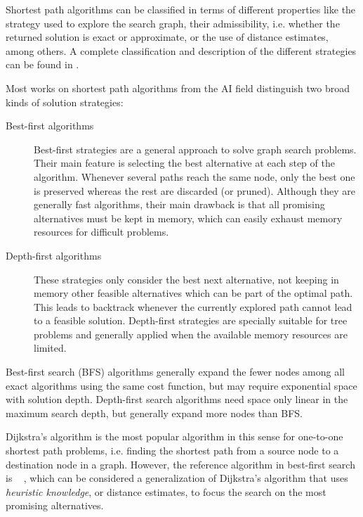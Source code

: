 Shortest path algorithms can be classified in terms of different properties like the strategy used to explore the search graph, their admissibility, i.e. whether the returned solution is exact or approximate, or the use of distance estimates, among others. A complete classification and description of the different strategies can be found in \citet{korf2010}.

Most works on shortest path algorithms from the AI field distinguish two broad kinds of solution strategies:

\begin{description}
    \item[Best-first algorithms] 
Best-first strategies are a general approach to solve graph search problems. Their main feature is selecting the best alternative at each step of the algorithm. Whenever several paths reach the same node, only the best one is preserved whereas the rest are discarded (or pruned). Although they are generally fast algorithms, their main drawback is that all promising alternatives must be kept in memory, which can easily exhaust memory resources for difficult problems.
	 \item[Depth-first algorithms] \citep{Korf1985} These strategies only consider the best next alternative, not keeping in memory other feasible alternatives which can be part of the optimal path. This leads to backtrack whenever the currently explored path cannot lead to a feasible solution. Depth-first strategies are specially suitable for tree problems and generally applied when the available memory resources are limited. 
\end{description}

Best-first search (BFS) algorithms generally expand the fewer nodes among all exact algorithms using the same cost function, but may require exponential space with solution depth. Depth-first search algorithms need space only linear in the maximum search depth, but generally expand more nodes than BFS. 

Dijkstra's algorithm \citep{dijkstra1959} is the most popular algorithm in this sense for one-to-one shortest path problems, i.e. finding the shortest path from a source node to a destination node in a graph. However, the reference algorithm in best-first search is \astar~ \citep{Hart1968}, which can be considered a generalization of Dijkstra's algorithm that uses \emph{heuristic knowledge}, or distance estimates, to focus the search on the most promising alternatives. 

